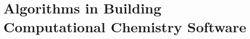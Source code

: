 \documentclass[a4paper,12pt,oneside]{book}
\theoremstyle{definition}\newtheorem{law}{Law}
\theoremstyle{plain}\newtheorem{theorem}{Theorem}
\theoremstyle{remark}\newtheorem{remark}{Remark}
\theoremstyle{axiom}\newtheorem{axiom}{Axiom}
\numberwithin{law}{chapter}
\numberwithin{theorem}{chapter}
\numberwithin{remark}{chapter}
\begin{document}

\part{Algorithms in Building Computational Chemistry Software}
%

%
%
%
%
%
%
%

%
%
%
%





%



\end{document}
